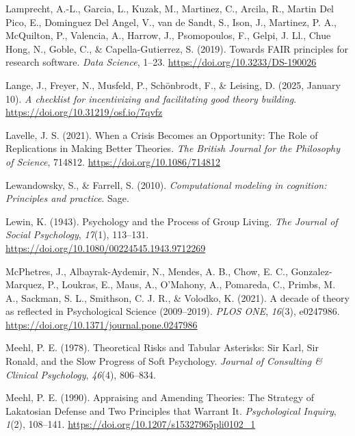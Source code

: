 \documentclass[man]{apa7}
\newlength{\cslhangindent}
\newenvironment{CSLReferences}[2] %
 {\begin{list}{}{%
  \setlength{\itemindent}{0pt}
  \setlength{\leftmargin}{0pt}
  \setlength{\parsep}{0pt}
  \ifodd #1
   \setlength{\leftmargin}{\cslhangindent}
   \setlength{\itemindent}{-1\cslhangindent}
  \fi
  \setlength{\itemsep}{#2\baselineskip}}}
 {\end{list}}
\begin{document}
\begin{CSLReferences}{1}{0}
Lamprecht, A.-L., Garcia, L., Kuzak, M., Martinez, C., Arcila, R., Martin Del Pico, E., Dominguez Del Angel, V., van de Sandt, S., Ison, J., Martinez, P. A., McQuilton, P., Valencia, A., Harrow, J., Psomopoulos, F., Gelpi, J. Ll., Chue Hong, N., Goble, C., \& Capella-Gutierrez, S. (2019). Towards {FAIR} principles for research software. \emph{Data Science}, 1--23. \url{https://doi.org/10.3233/DS-190026}

Lange, J., Freyer, N., Musfeld, P., Schönbrodt, F., \& Leising, D. (2025, January 10). \emph{A checklist for incentivizing and facilitating good theory building}. \url{https://doi.org/10.31219/osf.io/7qvfz}

Lavelle, J. S. (2021). When a {Crisis Becomes} an {Opportunity}: {The Role} of {Replications} in {Making Better Theories}. \emph{The British Journal for the Philosophy of Science}, 714812. \url{https://doi.org/10.1086/714812}

Lewandowsky, S., \& Farrell, S. (2010). \emph{Computational modeling in cognition: {Principles} and practice}. Sage.

Lewin, K. (1943). Psychology and the {Process} of {Group Living}. \emph{The Journal of Social Psychology}, \emph{17}(1), 113--131. \url{https://doi.org/10.1080/00224545.1943.9712269}

McPhetres, J., Albayrak-Aydemir, N., Mendes, A. B., Chow, E. C., Gonzalez-Marquez, P., Loukras, E., Maus, A., O'Mahony, A., Pomareda, C., Primbs, M. A., Sackman, S. L., Smithson, C. J. R., \& Volodko, K. (2021). A decade of theory as reflected in {Psychological Science} (2009--2019). \emph{PLOS ONE}, \emph{16}(3), e0247986. \url{https://doi.org/10.1371/journal.pone.0247986}

Meehl, P. E. (1978). Theoretical {Risks} and {Tabular Asterisks}: {Sir Karl}, {Sir Ronald}, and the {Slow Progress} of {Soft Psychology}. \emph{Journal of Consulting \& Clinical Psychology}, \emph{46}(4), 806--834.

Meehl, P. E. (1990). Appraising and {Amending Theories}: {The Strategy} of {Lakatosian Defense} and {Two Principles} that {Warrant It}. \emph{Psychological Inquiry}, \emph{1}(2), 108--141. \url{https://doi.org/10.1207/s15327965pli0102_1}


\end{CSLReferences}
\end{document}
